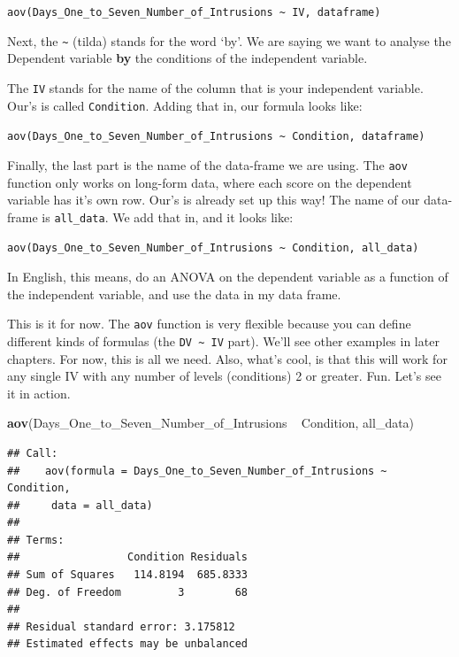 \documentclass[]{book}
\newenvironment{Shaded}{\begin{snugshade}}{\end{snugshade}}
\newcommand{\KeywordTok}[1]{\textcolor[rgb]{0.13,0.29,0.53}{\textbf{{#1}}}}
\newcommand{\StringTok}[1]{\textcolor[rgb]{0.31,0.60,0.02}{{#1}}}
\newcommand{\NormalTok}[1]{{#1}}
\theoremstyle{definition}
\theoremstyle{definition}
\theoremstyle{definition}
\theoremstyle{remark}
\begin{document}
\texttt{aov(Days\_One\_to\_Seven\_Number\_of\_Intrusions\ \textasciitilde{}\ IV,\ dataframe)}

Next, the \texttt{\textasciitilde{}} (tilda) stands for the word `by'.
We are saying we want to analyse the Dependent variable \textbf{by} the
conditions of the independent variable.

The \texttt{IV} stands for the name of the column that is your
independent variable. Our's is called \texttt{Condition}. Adding that
in, our formula looks like:

\texttt{aov(Days\_One\_to\_Seven\_Number\_of\_Intrusions\ \textasciitilde{}\ Condition,\ dataframe)}

Finally, the last part is the name of the data-frame we are using. The
\texttt{aov} function only works on long-form data, where each score on
the dependent variable has it's own row. Our's is already set up this
way! The name of our data-frame is \texttt{all\_data}. We add that in,
and it looks like:

\texttt{aov(Days\_One\_to\_Seven\_Number\_of\_Intrusions\ \textasciitilde{}\ Condition,\ all\_data)}

In English, this means, do an ANOVA on the dependent variable as a
function of the independent variable, and use the data in my data frame.

This is it for now. The \texttt{aov} function is very flexible because
you can define different kinds of formulas (the
\texttt{DV\ \textasciitilde{}\ IV} part). We'll see other examples in
later chapters. For now, this is all we need. Also, what's cool, is that
this will work for any single IV with any number of levels (conditions)
2 or greater. Fun. Let's see it in action.

\begin{Shaded}
\begin{Highlighting}[]
\KeywordTok{aov}\NormalTok{(Days_One_to_Seven_Number_of_Intrusions ~}\StringTok{ }\NormalTok{Condition, all_data)}
\end{Highlighting}
\end{Shaded}

\begin{verbatim}
## Call:
##    aov(formula = Days_One_to_Seven_Number_of_Intrusions ~ Condition, 
##     data = all_data)
## 
## Terms:
##                 Condition Residuals
## Sum of Squares   114.8194  685.8333
## Deg. of Freedom         3        68
## 
## Residual standard error: 3.175812
## Estimated effects may be unbalanced
\end{verbatim}
\end{document}
